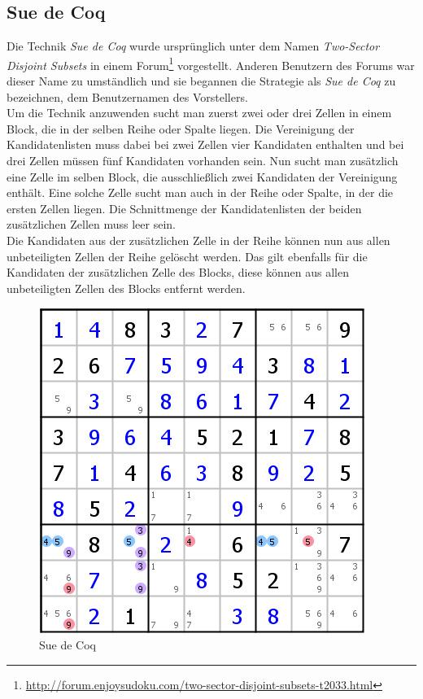 \newpage
\subsection{Sue de Coq}
Die Technik \textit{Sue de Coq} wurde ursprünglich unter dem Namen \textit{Two-Sector Disjoint Subsets} in einem Forum\footnote{\url{http://forum.enjoysudoku.com/two-sector-disjoint-subsets-t2033.html}} vorgestellt. Anderen Benutzern des Forums war dieser Name zu umständlich und sie begannen die Strategie als \textit{Sue de Coq} zu bezeichnen, dem Benutzernamen des Vorstellers.\\
Um die Technik anzuwenden sucht man zuerst zwei oder drei Zellen in einem Block, die in der selben Reihe oder Spalte liegen. Die Vereinigung der Kandidatenlisten muss dabei bei zwei Zellen vier Kandidaten enthalten und bei drei Zellen müssen fünf Kandidaten vorhanden sein. Nun sucht man zusätzlich eine Zelle im selben Block, die ausschließlich zwei Kandidaten der Vereinigung enthält. Eine solche Zelle sucht man auch in der Reihe oder Spalte, in der die ersten Zellen liegen. Die Schnittmenge der Kandidatenlisten der beiden zusätzlichen Zellen muss leer sein. \\
Die Kandidaten aus der zusätzlichen Zelle in der Reihe können nun aus allen unbeteiligten Zellen der Reihe gelöscht werden.  Das gilt ebenfalls für die Kandidaten der zusätzlichen Zelle des Blocks, diese können aus allen unbeteiligten Zellen des Blocks entfernt werden.\\

\begin{figure}[h]
\begin{center}
\includegraphics{./img/Sue_de_Coq.png}
\caption{Sue de Coq}
\end{center}
\end{figure}

